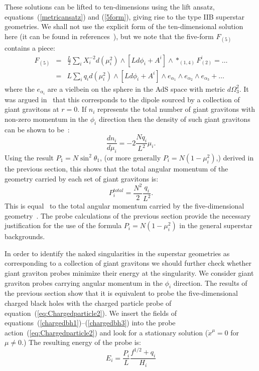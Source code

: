\documentclass[a4paper,12pt]{article}
\begin{document}
These solutions can be lifted to ten-dimensions using the lift ansatz, equations~(\ref{metricansatz}) and (\ref{5form}), giving rise to the type IIB superstar geometries. We shall not use the explicit form of the ten-dimensional solution here (it can be found in references~\cite{Cvetic:1999xp, Myers:2001aq}), but we note that the five-form $F_{(5)}$ contains a piece:
\begin{eqnarray}
  \label{eq:dipole}
  F_{(5)} &=& \frac{L}{2}  \sum_i  X_i^{-2}  d(\mu_i^{2}) \wedge [L d\phi_i + A^i] \wedge *_{(1,4)} F^i_{(2)} = \ldots \nonumber \\
&=& L \sum_i q_i  d(\mu_i^{2}) \wedge  [L d\phi_i + A^i] \wedge e_{\alpha_1} \wedge e_{\alpha_2} \wedge e_{\alpha_3} + \ldots
\end{eqnarray}
where the $e_{\alpha_i}$ are a vielbein on the sphere in the AdS space with metric $d \Omega_3^2$. It was argued in~\cite{Myers:2001aq} that this corresponds to the dipole sourced by a collection of giant gravitons at $r=0$. If $n_i$ represents the total number of giant gravitons with non-zero momentum in the $\phi_i$ direction then the density of such giant gravitons can be shown to be~\cite{Myers:2001aq}:
\begin{equation}
  \frac{d n_i}{d \mu_i} = - 2 \frac{N q_i}{L^2} \mu_i.
\end{equation}
Using the result $P_1 = N \sin^2 \theta_1$, (or more generally $P_i = N(1 - \mu_i^2)$,) derived in the previous section, this shows that the total angular momentum of the geometry carried by each set of giant gravitons is:
\begin{equation}
  P^{total}_i = \frac{N^2}{2} \frac{q_i}{L^2}.
\end{equation}
This is equal~\cite{Myers:2001aq} to the total angular momentum carried by the five-dimensional geometry~\cite{Behrndt:1998jd}. The probe calculations of the previous section provide the necessary justification for the use of the formula  $P_i = N(1 - \mu_i^2)$ in the general superstar backgrounds.

In order to identify the naked singularities in the superstar geometries as corresponding to a collection of giant gravitons  we should further check whether giant graviton probes
minimize their energy at the singularity. We consider giant graviton probes
carrying angular momentum in the $\phi_i$ direction. The results of the
previous section show that it is equivalent to probe the five-dimensional
charged black holes with the charged particle probe of
equation~(\ref{eq:Chargedparticle2}). We insert the fields of
equations~(\ref{chargedbh1})--(\ref{chargedbh3}) into the probe
action~(\ref{eq:Chargedparticle2}) and look for a stationary solution
($\dot{x}^{\mu} = 0$ for $\mu \neq 0$.) The resulting energy of the probe is:
\begin{equation}
E_i = \frac{P_i}{L} \frac{f^{1/2} +q_i}{H_i}
\end{equation}
\end{document}
